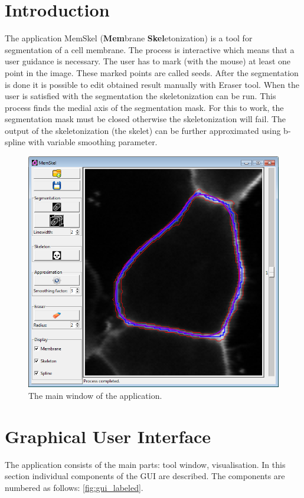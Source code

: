 \section{Introduction}
The application MemSkel (\textbf{Mem}brane \textbf{Skel}etonization) is a tool for segmentation of a cell membrane. The process is interactive which means that a user guidance is necessary. The user has to mark (with the mouse) at least one point in the image. These marked points are called seeds. After the segmentation is done it is possible to edit obtained result manually with Eraser tool. When the user is satisfied with the segmentation the skeletonization can be run. This process finds the medial axis of the segmentation mask. For this to work, the segmentation mask must be closed otherwise the skeletonization will fail. The output of the skeletonization (the skelet) can be further approximated using b-spline with variable smoothing parameter.

\begin{figure}[htb]
    \centering
    \includegraphics[width = .7\linewidth]{gui.png}
    \caption{The main window of the application.}
    \label{fig:gui}
\end{figure}

\section{Graphical User Interface} \label{sec:stEd}
The application consists of the main parts: tool window, visualisation. In this section individual components of the GUI are described. The components are numbered as follows:
 \ref{fig:gui_labeled}.

